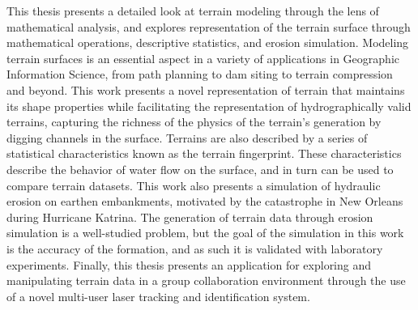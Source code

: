  
 

This thesis presents a detailed look at terrain modeling through the lens of mathematical analysis, and explores representation of the terrain surface 
through mathematical operations, descriptive statistics, and erosion simulation.
Modeling terrain surfaces is an essential aspect in a variety of applications in Geographic Information Science, from path planning to dam siting to terrain compression and beyond.
This work presents a novel representation of terrain that maintains its shape properties while facilitating the representation of hydrographically valid terrains, capturing the richness of the physics of the terrain's generation by digging channels in the surface.
Terrains are also described by a series of statistical characteristics known as the terrain fingerprint. These characteristics describe the behavior of water flow on the surface, and in turn can be used to compare terrain datasets.
This work also presents a simulation of hydraulic erosion on earthen embankments, motivated by the catastrophe in New Orleans during Hurricane Katrina. The generation of terrain data through erosion simulation is a well-studied problem, but the goal of the simulation in this work is the accuracy of the formation, and as such it is validated with laboratory experiments.
Finally, this thesis presents an application for exploring and manipulating terrain data in a group collaboration environment through the use of a novel multi-user laser tracking and identification system.


